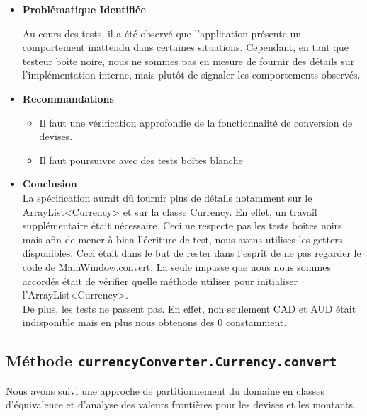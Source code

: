 \documentclass[letterpaper, 10pt]{article}
\begin{document}
\begin{itemize}
\item \textbf{Problématique Identifiée}

Au cours des tests, il a été observé que l'application présente un comportement inattendu dans certaines situations. Cependant, en tant que testeur boîte noire, nous ne sommes pas en mesure de fournir des détails sur l'implémentation interne, mais plutôt de signaler les comportements observés.
\\
\item \textbf{Recommandations}

\begin{itemize}
    \item Il faut une vérification approfondie de la fonctionnalité de conversion de devises.
    \item Il faut poursuivre avec des tests boîtes blanche\\
\end{itemize}
\item \textbf{Conclusion}\\
La spécification aurait dû fournir plus de détails notamment sur le ArrayList<Currency> et sur la classe Currency. En effet, un travail supplémentaire était nécessaire. Ceci ne respecte pas les tests boites noirs mais afin de mener à bien l'écriture de test, nous avons utilises les getters disponibles. Ceci était dans le but de rester dans l'esprit de ne pas regarder le code de MainWindow.convert. La seule impasse que nous nous sommes accordés était de vérifier quelle méthode utiliser pour initialiser l'ArrayList<Currency>. \\De plus, les tests ne passent pas. En effet, non seulement CAD et AUD était indisponible mais en plus nous obtenons des 0 constamment. 
\end{itemize}
\subsection*{Méthode \texttt{currencyConverter.Currency.convert}}
Nous avons suivi une approche de partitionnement du domaine en classes d'équivalence et d'analyse des valeurs frontières pour les devises et les montants.
\end{document}
